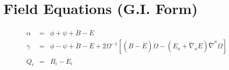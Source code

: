 \documentclass[10pt,letterpaper]{article}
\numberwithin{equation}{section}
\begin{document}
\section{Field Equations (G.I. Form)}
%
\begin{eqnarray}
\alpha &=& \phi + \psi + \dot B - \ddot E
\nonumber\\
\gamma &=& \phi -\psi + \dot B-\ddot E + 2\Omega^{-1}\left[ (B-\dot E)\dot \Omega -(E_a + \tilde\nabla_a E )\tilde\nabla^a \Omega\right]
\nonumber\\
Q_i &=& B_i - \dot E_i
\end{eqnarray}
\end{document}
